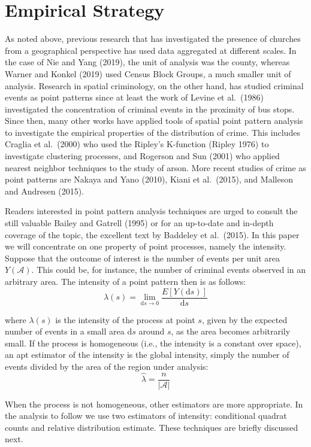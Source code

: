 \documentclass[smallextended]{svjour3}       %
\begin{document}
\hypertarget{methods}{%
\section{Empirical Strategy}\label{methods}}

As noted above, previous research that has investigated the presence of
churches from a geographical perspective has used data aggregated at
different scales. In the case of Nie and Yang (2019), the unit of
analysis was the county, whereas Warner and Konkel (2019) used Census
Block Groups, a much smaller unit of analysis. Research in spatial
criminology, on the other hand, has studied criminal events as point
patterns since at least the work of Levine et al.~(1986) investigated
the concentration of criminal events in the proximity of bus stops.
Since then, many other works have applied tools of spatial point pattern
analysis to investigate the empirical properties of the distribution of
crime. This includes Craglia et al.~(2000) who used the Ripley's
K-function (Ripley 1976) to investigate clustering processes, and
Rogerson and Sun (2001) who applied nearest neighbor techniques to the
study of arson. More recent studies of crime as point patterns are
Nakaya and Yano (2010), Kiani et al.~(2015), and Malleson and Andresen
(2015).

Readers interested in point pattern analysis techniques are urged to
consult the still valuable Bailey and Gatrell (1995) or for an
up-to-date and in-depth coverage of the topic, the excellent text by
Baddeley et al.~(2015). In this paper we will concentrate on one
property of point processes, namely the intensity. Suppose that the
outcome of interest is the number of events per unit area
\(Y(\mathcal{A})\). This could be, for instance, the number of criminal
events observed in an arbitrary area. The intensity of a point pattern
then is as follows: \[
\lambda(s)=\lim_{\text{d}s \to 0}\frac{E[Y(\text{d}s)]}{\text{d}s}
\]

where \(\lambda(s)\) is the intensity of the process at point \(s\),
given by the expected number of events in a small area \(\text{d}s\)
around \(s\), as the area becomes arbitrarily small. If the process is
homogeneous (i.e., the intensity is a constant over space), an apt
estimator of the intensity is the global intensity, simply the number of
events divided by the area of the region under analysis: \[
\hat{\lambda} = \frac{n}{|\mathcal{A}|}
\]

When the process is not homogeneous, other estimators are more
appropriate. In the analysis to follow we use two estimators of
intensity: conditional quadrat counts and relative distribution
estimate. These techniques are briefly discussed next.
\end{document}
